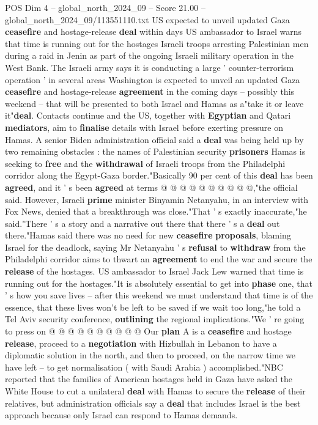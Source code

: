\begin{textsample}{POS Dim 4 – global\_north\_2024\_09 – Score 21.00 – global\_north\_2024\_09/113551110.txt}  \label{ex:f4_pos_323}
US expected to unveil updated Gaza \textbf{ceasefire} and hostage-release \textbf{deal} within days US ambassador to Israel warns that time is running out for the hostages Israeli troops arresting Palestinian men during a raid in Jenin as part of the ongoing Israeli military operation in the West Bank.
The Israeli army says it is conducting a large ' counter-terrorism operation ' in several areas Washington is expected to unveil an updated Gaza \textbf{ceasefire} and hostage-release \textbf{agreement} in the coming days -- possibly this weekend -- that will be presented to both Israel and Hamas as a"take it or leave it"\textbf{deal}.
Contacts continue and the US, together with \textbf{Egyptian} and Qatari \textbf{mediators}, aim to \textbf{finalise} details with Israel before exerting pressure on Hamas.
A senior Biden administration official said a \textbf{deal} was being held up by two remaining obstacles : the names of Palestinian security \textbf{prisoners} Hamas is seeking to \textbf{free} and the \textbf{withdrawal} of Israeli troops from the Philadelphi corridor along the Egypt-Gaza border."Basically 90 per cent of this \textbf{deal} has been \textbf{agreed}, and it ' s been \textbf{agreed} at terms @ @ @ @ @ @ @ @ @ @,"the official said.
However, Israeli \textbf{prime} minister Binyamin Netanyahu, in an interview with Fox News, denied that a breakthrough was close."That ' s exactly inaccurate,"he said."There ' s a story and a narrative out there that there ' s a \textbf{deal} out there."Hamas said there was no need for new \textbf{ceasefire} \textbf{proposals}, blaming Israel for the deadlock, saying Mr Netanyahu ' s \textbf{refusal} to \textbf{withdraw} from the Philadelphi corridor aims to thwart an \textbf{agreement} to end the war and secure the \textbf{release} of the hostages.
US ambassador to Israel Jack Lew warned that time is running out for the hostages."It is absolutely essential to get into \textbf{phase} one, that ' s how you save lives -- after this weekend we must understand that time is of the essence, that these lives won't be left to be saved if we wait too long,"he told a Tel Aviv security conference, \textbf{outlining} the regional implications."We ' re going to press on @ @ @ @ @ @ @ @ @ @ Our \textbf{plan} A is a \textbf{ceasefire} and hostage \textbf{release}, proceed to a \textbf{negotiation} with Hizbullah in Lebanon to have a diplomatic solution in the north, and then to proceed, on the narrow time we have left -- to get normalisation ( with Saudi Arabia ) accomplished."NBC reported that the families of American hostages held in Gaza have asked the White House to cut a unilateral \textbf{deal} with Hamas to secure the \textbf{release} of their relatives, but administration officials say a \textbf{deal} that includes Israel is the best approach because only Israel can respond to Hamas demands.

\end{textsample}
